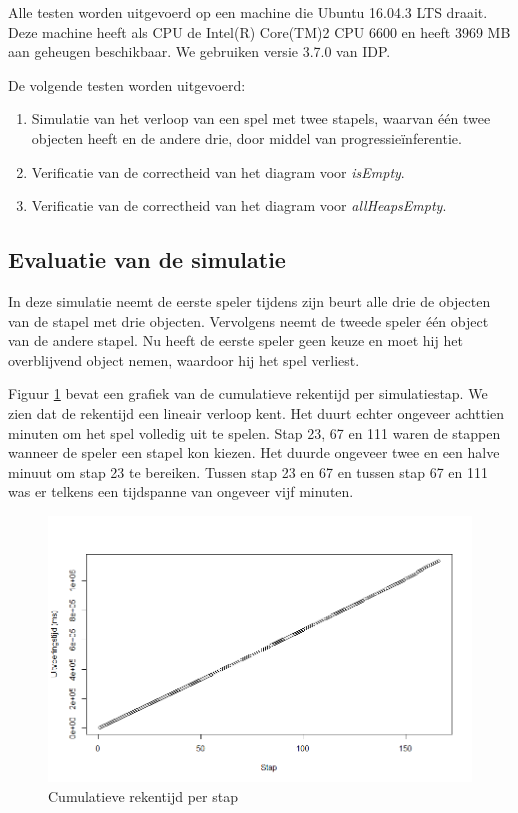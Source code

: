 Alle testen worden uitgevoerd op een machine die Ubuntu 16.04.3 LTS draait. Deze machine heeft als CPU de Intel(R) Core(TM)2 CPU 6600 en heeft 3969 MB aan geheugen beschikbaar. We gebruiken versie 3.7.0 van IDP.

De volgende testen worden uitgevoerd:

\begin{enumerate}
	\item Simulatie van het verloop van een spel met twee stapels, waarvan \'e\'en twee objecten heeft en de andere drie, door middel van progressie\"inferentie.
	\item Verificatie van de correctheid van het diagram voor \textit{isEmpty}.
	\item Verificatie van de correctheid van het diagram voor \textit{allHeapsEmpty}. 
\end{enumerate}

\subsection{Evaluatie van de simulatie}

In deze simulatie neemt de eerste speler tijdens zijn beurt alle drie de objecten van de stapel met drie objecten. Vervolgens neemt de tweede speler \'e\'en object van de andere stapel. Nu heeft de eerste speler geen keuze en moet hij het overblijvend object nemen, waardoor hij het spel verliest.

Figuur \ref{fig:ms} bevat een grafiek van de cumulatieve rekentijd per simulatiestap. We zien dat de rekentijd een lineair verloop kent. Het duurt echter ongeveer achttien minuten om het spel volledig uit te spelen. Stap 23, 67 en 111 waren de stappen wanneer de speler een stapel kon kiezen. Het duurde ongeveer twee en een halve minuut om stap 23 te bereiken. Tussen stap 23 en 67 en tussen stap 67 en 111 was er telkens een tijdspanne van ongeveer vijf minuten.

\begin{figure}
	\includegraphics[width=1.05\textwidth]{chap-evaluatie/ms.png}
	\caption{Cumulatieve rekentijd per stap}
	\label{fig:ms}
\end{figure}

